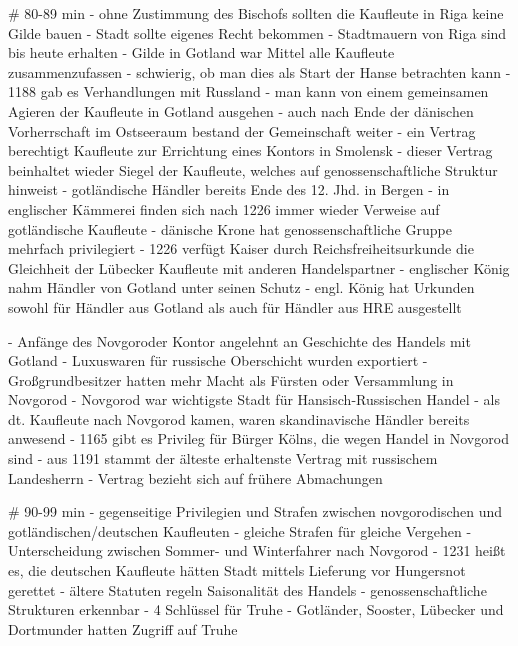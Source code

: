 \documentclass[10pt,a4paper,oneside,ngerman,numbers=noenddot]{scrartcl}
\begin{document}
# 80-89 min
- ohne Zustimmung des Bischofs sollten die Kaufleute in Riga keine Gilde bauen
- Stadt sollte eigenes Recht bekommen
- Stadtmauern von Riga sind bis heute erhalten
- Gilde in Gotland war Mittel alle Kaufleute zusammenzufassen
- schwierig, ob man dies als Start der Hanse betrachten kann
- 1188 gab es Verhandlungen mit Russland
- man kann von einem gemeinsamen Agieren der Kaufleute in Gotland ausgehen
- auch nach Ende der dänischen Vorherrschaft im Ostseeraum bestand der Gemeinschaft weiter
- ein Vertrag berechtigt Kaufleute zur Errichtung eines Kontors in Smolensk
- dieser Vertrag beinhaltet wieder Siegel der Kaufleute, welches auf genossenschaftliche Struktur
  hinweist
- gotländische Händler bereits Ende des 12. Jhd. in Bergen
- in englischer Kämmerei finden sich nach 1226 immer wieder Verweise auf gotländische Kaufleute
- dänische Krone hat genossenschaftliche Gruppe mehrfach privilegiert
- 1226 verfügt Kaiser durch Reichsfreiheitsurkunde die Gleichheit der Lübecker Kaufleute mit anderen
  Handelspartner
- englischer König nahm Händler von Gotland unter seinen Schutz
- engl. König hat Urkunden sowohl für Händler aus Gotland als auch für Händler aus HRE ausgestellt

- Anfänge des Novgoroder Kontor angelehnt an Geschichte des Handels mit Gotland
- Luxuswaren für russische Oberschicht wurden exportiert
- Großgrundbesitzer hatten mehr Macht als Fürsten oder Versammlung in Novgorod
- Novgorod war wichtigste Stadt für Hansisch-Russischen Handel
- als dt. Kaufleute nach Novgorod kamen, waren skandinavische Händler bereits anwesend
- 1165 gibt es Privileg für Bürger Kölns, die wegen Handel in Novgorod sind
- aus 1191 stammt der älteste erhaltenste Vertrag mit russischem Landesherrn
- Vertrag bezieht sich auf frühere Abmachungen

# 90-99 min
- gegenseitige Privilegien und Strafen zwischen novgorodischen und gotländischen/deutschen Kaufleuten
- gleiche Strafen für gleiche Vergehen
- Unterscheidung zwischen Sommer- und Winterfahrer nach Novgorod
- 1231 heißt es, die deutschen Kaufleute hätten Stadt mittels Lieferung vor Hungersnot gerettet
- ältere Statuten regeln Saisonalität des Handels
- genossenschaftliche Strukturen erkennbar
- 4 Schlüssel für Truhe
    - Gotländer, Sooster, Lübecker und Dortmunder hatten Zugriff auf Truhe
\end{document}
